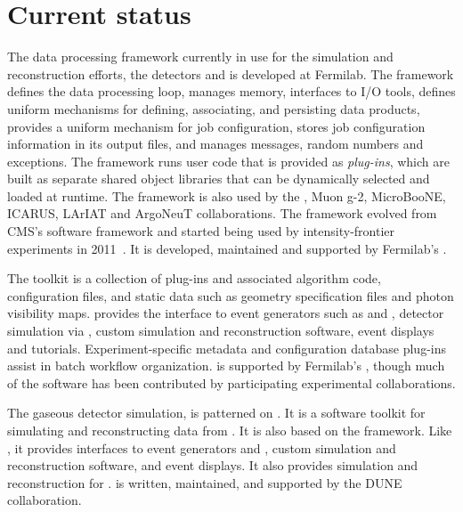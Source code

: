 \documentclass[../main-v1.tex]{subfiles}
\begin{document}
\section{Current status }

The data processing framework currently in use for the  simulation and reconstruction efforts, the  detectors and  is  developed at Fermilab.  The  framework defines the data processing loop, manages memory, interfaces to I/O tools, defines uniform mechanisms for defining, associating, and persisting data products, provides a uniform mechanism for job configuration, stores job configuration information in its output files, and manages messages, random numbers and exceptions.  The  framework runs user code that is provided as {\it plug-ins}, which are built as separate shared object libraries that can be dynamically selected and loaded at runtime.  The  framework is also used by the , Muon g-2, MicroBooNE, ICARUS, LArIAT and ArgoNeuT collaborations.  The  framework evolved from CMS's software framework and started being used by intensity-frontier experiments in 2011~\cite{Green:2012gv}. It is developed, maintained and supported by Fermilab's .

The  toolkit is a collection of  plug-ins and associated algorithm code, configuration files, and static data such as geometry specification files and photon visibility maps.   provides the interface to event generators such as  and , detector simulation via , custom simulation and reconstruction software, event displays and tutorials.  Experiment-specific metadata and configuration database plug-ins assist in batch workflow organization.   is supported by Fermilab's , though much of the software has been contributed by participating experimental collaborations.


The gaseous detector simulation,  is patterned on .  It is a software toolkit for simulating and reconstructing data from .  It is also based on the  framework.  Like , it provides interfaces to event generators and , custom simulation and reconstruction software, and event displays.  It also provides simulation and reconstruction for .   is written, maintained, and supported by the DUNE collaboration.
\end{document}
